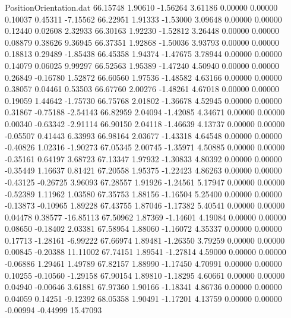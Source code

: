 \begin{filecontents}{PositionOrientation.dat}
  66.15748    1.90610   -1.56264     3.61186    0.00000    0.00000    0.10037    0.45311   -7.15562
  66.22951    1.91333   -1.53000     3.09648    0.00000    0.00000    0.12440    0.02608    2.32933
  66.30163    1.92230   -1.52812     3.26448    0.00000    0.00000    0.08879    0.38626    9.36945
  66.37351    1.92868   -1.50036     3.93793    0.00000    0.00000    0.18813    0.29489   -1.85438
  66.45358    1.94374   -1.47675     3.78944    0.00000    0.00000    0.14079    0.06025    9.99297
  66.52563    1.95389   -1.47240     4.50940    0.00000    0.00000    0.26849   -0.16780    1.52872
  66.60560    1.97536   -1.48582     4.63166    0.00000    0.00000    0.38057    0.04461    0.53503
  66.67760    2.00276   -1.48261     4.67018    0.00000    0.00000    0.19059    1.44642   -1.75730
  66.75768    2.01802   -1.36678     4.52945    0.00000    0.00000    0.31867   -0.75188   -2.54143
  66.82959    2.04094   -1.42085     4.34671    0.00000    0.00000    0.00340   -0.63342   -2.91114
  66.90150    2.04118   -1.46639     4.13737    0.00000    0.00000   -0.05507    0.41443    6.33993
  66.98164    2.03677   -1.43318     4.64548    0.00000    0.00000   -0.40826    1.02316   -1.90273
  67.05345    2.00745   -1.35971     4.50885    0.00000    0.00000   -0.35161    0.64197    3.68723
  67.13347    1.97932   -1.30833     4.80392    0.00000    0.00000   -0.35449    1.16637    0.81421
  67.20558    1.95375   -1.22423     4.86263    0.00000    0.00000   -0.43125   -0.26725    3.96093
  67.28557    1.91926   -1.24561     5.17947    0.00000    0.00000   -0.52389    1.11962    1.03580
  67.35753    1.88156   -1.16504     5.25400    0.00000    0.00000   -0.13873   -0.10965    1.89228
  67.43755    1.87046   -1.17382     5.40541    0.00000    0.00000    0.04478    0.38577  -16.85113
  67.50962    1.87369   -1.14601     4.19084    0.00000    0.00000    0.08650   -0.18402    2.03381
  67.58954    1.88060   -1.16072     4.35337    0.00000    0.00000    0.17713   -1.28161   -6.99222
  67.66974    1.89481   -1.26350     3.79259    0.00000    0.00000    0.00845   -0.20388   11.11002
  67.74151    1.89541   -1.27814     4.59000    0.00000    0.00000   -0.06886    1.29461    1.49789
  67.82157    1.88990   -1.17450     4.70991    0.00000    0.00000    0.10255   -0.10560   -1.29158
  67.90154    1.89810   -1.18295     4.60661    0.00000    0.00000    0.04940   -0.00646    3.61881
  67.97360    1.90166   -1.18341     4.86736    0.00000    0.00000    0.04059    0.14251   -9.12392
  68.05358    1.90491   -1.17201     4.13759    0.00000    0.00000   -0.00994   -0.44999   15.47093

\end{filecontents}
